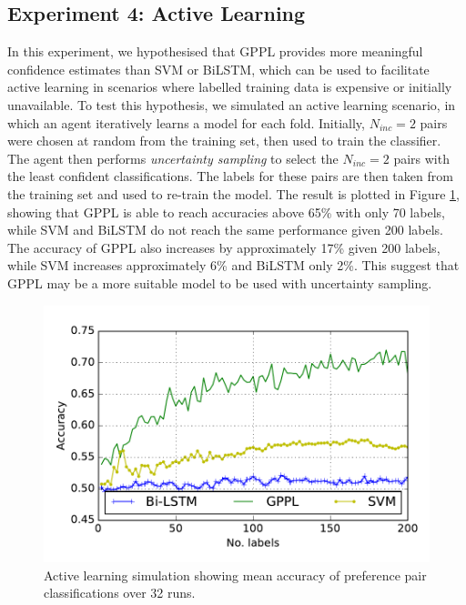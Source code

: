\subsection{Experiment 4: Active Learning}

In this experiment, we hypothesised that GPPL provides more meaningful confidence estimates than SVM or BiLSTM,
which can be used to facilitate active learning in scenarios where labelled training data is expensive
or initially unavailable.
To test this hypothesis, we simulated an active learning scenario, in which an agent 
iteratively learns a model for each fold. Initially, $N_{inc}=2$ pairs were chosen at random from the training set,
then used to train the classifier. The agent then performs \emph{uncertainty sampling} to select the $N_{inc}=2$
 pairs with the least confident classifications. The labels for these pairs are then taken from the training set and 
used to re-train the model. The result is plotted in Figure \ref{fig:active_learning}, showing that GPPL
is able to reach accuracies above 65\% with only 70 labels, while SVM and BiLSTM do not reach the same performance
given 200 labels. The accuracy of GPPL also increases by approximately 17\% given 200 labels, while SVM increases
approximately 6\% and BiLSTM only 2\%. This suggest that GPPL may be a more suitable model to be used with
uncertainty sampling.
\begin{figure}
\includegraphics[width=1.0\columnwidth,trim=0 0 0 22,clip=true]{figures/active_learning/test_acc}
\caption{Active learning simulation showing mean accuracy of preference pair classifications over 32 runs.}
\label{fig:active_learning}
\end{figure}

